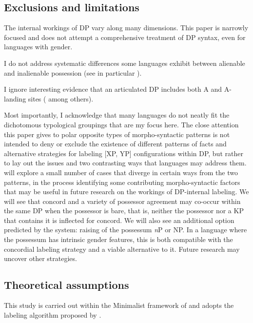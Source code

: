 \documentclass[output=paper
,modfonts
,nonflat]{langsci/langscibook}
\begin{document}
\subsection{Exclusions and limitations} \label{sec-carstens:1.3}
The internal workings of DP vary along many dimensions. This paper is narrowly focused and does not attempt a comprehensive treatment of DP syntax, even for languages with gender.

I do not address systematic differences some languages exhibit between alienable and inalienable possession (see in particular \citealt{Den_Dikken2015}).     

I ignore interesting evidence that an articulated DP includes both A\textquotesingle{} and A-landing sites (\citealt{Szabolcsi1983,Gavruseva2000,Alexiadou2001,Haegeman2004} among others).    

Most importantly, I acknowledge that many languages do not neatly fit the dichotomous typological groupings that are my focus here. The close attention this paper gives to polar opposite types of morpho-syntactic patterns is not intended to deny or exclude the existence of different patterns of facts and alternative strategies for labeling [XP, YP] configurations within DP, but rather to lay out the issues and two contrasting ways that languages may address them.  will explore a small number of cases that diverge in certain ways from the two patterns, in the process identifying some contributing morpho-syntactic factors that may be useful in future research on the workings of DP-internal labeling. We will see that concord and a variety of possessor agreement may co-occur within the same DP when the possessor is bare, that is, neither the possessor nor a KP that contains it is inflected for concord. We will also see an additional option predicted by the system: raising of the possessum \textit{n}P or NP. In a language where the possessum has intrinsic gender features, this is both compatible with the concordial labeling strategy and a viable alternative to it. Future research may uncover other strategies.    

\subsection{Theoretical assumptions} \label{sec-carstens:1.4}
This study is carried out within the Minimalist framework of \citet{Chomsky2000, Chomsky2001} and adopts the labeling algorithm proposed by \citet{Chomsky2013, Chomsky2015}. 
\end{document}
